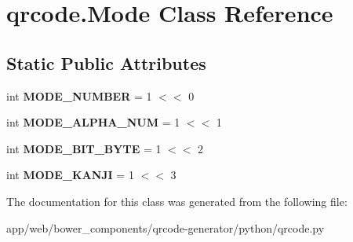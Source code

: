 \hypertarget{classqrcode_1_1_mode}{}\section{qrcode.\+Mode Class Reference}
\label{classqrcode_1_1_mode}
\subsection*{Static Public Attributes}
\begin{DoxyCompactItemize}
\item 
\mbox{\label{classqrcode_1_1_mode_afa43679f94df02000def96e476a70dc9}} 
int {\bfseries M\+O\+D\+E\+\_\+\+N\+U\+M\+B\+ER} = 1 $<$$<$ 0
\item 
\mbox{\label{classqrcode_1_1_mode_adcbf456f1e652aa31d767fb374d90973}} 
int {\bfseries M\+O\+D\+E\+\_\+\+A\+L\+P\+H\+A\+\_\+\+N\+UM} = 1 $<$$<$ 1
\item 
\mbox{\label{classqrcode_1_1_mode_a345937baa11b3e9bc1b6f20b4471afb1}} 
int {\bfseries M\+O\+D\+E\+\_\+B\+I\+T\+\_\+\+B\+Y\+TE} = 1 $<$$<$ 2
\item 
\mbox{\label{classqrcode_1_1_mode_a0001c31caaec2d599d4559be0d2646ee}} 
int {\bfseries M\+O\+D\+E\+\_\+\+K\+A\+N\+JI} = 1 $<$$<$ 3
\end{DoxyCompactItemize}


The documentation for this class was generated from the following file\+:\begin{DoxyCompactItemize}
\item 
app/web/bower\+\_\+components/qrcode-\/generator/python/qrcode.\+py\end{DoxyCompactItemize}
